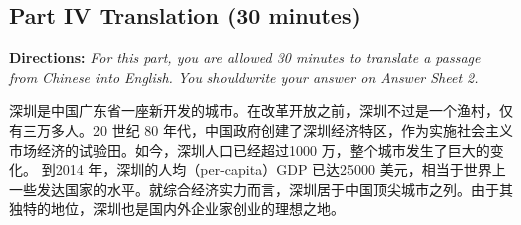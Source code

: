 \documentclass[UTF8,11pt]{ctexart}
\begin{document}
\subsection*{\textbf{Part IV Translation (30 minutes)}}


\textbf{Directions:} \textit{For this part, you are allowed 30 minutes to translate a passage from Chinese into English. You} \textit{shouldwrite your answer on Answer Sheet 2.}


深圳是中国广东省一座新开发的城市。在改革开放之前，深圳不过是一个渔村，仅有三万多人。20 世纪 80 年代，中国政府创建了深圳经济特区，作为实施社会主义市场经济的试验田。如今，深圳人口已经超过1000 万，整个城市发生了巨大的变化。 到2014 年，深圳的人均（per-capita）GDP 已达25000 美元，相当于世界上一些发达国家的水平。就综合经济实力而言，深圳居于中国顶尖城市之列。由于其独特的地位，深圳也是国内外企业家创业的理想之地。
\end{document}
